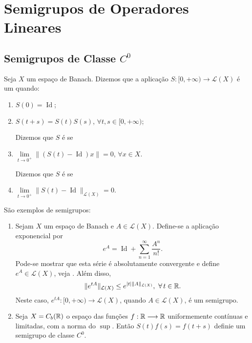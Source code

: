 \chapter{Semigrupos de Operadores Lineares}

\section{Semigrupos de Classe $C^0$}



\begin{definition}
     Seja $X$ um espaço de Banach. Dizemos que a aplicação $S:[0,+\infty)\longrightarrow \mathcal{L}(X)$ é um   quando:
\begin{enumerate}
    \item $S(0)=\operatorname{Id}$;
    \item $S(t+s)=S(t)S(s)$, $\forall t,s\in [0,+\infty)$;

Dizemos que $S$ é  se

    \item $\lim\limits_{t\to0^+} \|(S(t)-\operatorname{Id})x\|=0$, $\forall x\in X$.

Dizemos que $S$ é  se 

\item $\lim\limits_{t\to 0^+}\|S(t)-\operatorname{Id}\|_{\mathcal{L}(X)}=0$.
\end{enumerate}
\end{definition}

   \begin{example} São exemplos de semigrupos:
        \begin{enumerate}
            \item Sejam $X$ um espaço de Banach e  $A\in \mathcal{L}(X)$. Define-se a aplicação exponencial por
            \[e^{A}=\operatorname{Id}+\sum_{n=1}^\infty \frac{A^n}{n!}.\]
Pode-se mostrar que esta série é absolutamente convergente e 
define $e^{A}\in \mathcal{L}(X)$, veja \cite[Apêndice 
2]{gomes1985semigrupos}. Além disso, 
\begin{equation*}
\nl{e^{tA}}\leq e^{|t|\nl{A}},\ \forall\, t\in \R.
\end{equation*}
Neste caso,  $e^{tA}:[0,+\infty)\to \mathcal{L}(X)$, quando $A\in \mathcal{L}(X)$, é um semigrupo.
            \item Seja $X=C_b(\mathbb{R})$  o espaço das funções $f:\mathbb{R}\longrightarrow \mathbb{R}$ uniformemente contínuas e limitadas, com a norma do $\sup$. Então $S(t)f(s)=f(t+s)$ definie um semigrupo de classe $C^0$.
        \end{enumerate}
    \end{example}


